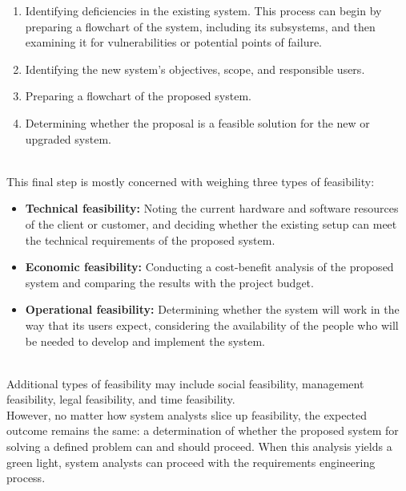 \begin{enumerate}
\item
\protect{}\label{kw8qwG1CLa-OgIdCaK4RV}
Identifying deficiencies in the existing system. This process can begin by preparing a flowchart of the system, including its subsystems, and then examining it for vulnerabilities or potential points of failure.
\item
\protect{}\label{-ak4nbWMlo0CHlHuLFpZT}
Identifying the new system's objectives, scope, and responsible users.
\item
\protect{}\label{VHtuj_CAzDUsZLxS2klvK}
Preparing a flowchart of the proposed system.
\item
\protect{}\label{w7Er1ROzxb5C5wgQUxPcC}
Determining whether the proposal is a feasible solution for the new or upgraded system.
\end{enumerate}
\\
This final step is mostly concerned with weighing three types of feasibility:

\begin{itemize}
\item
\protect{}\label{GjoApvV-ZDsQj1Kjb7LhV}
\textbf{Technical feasibility:} Noting the current hardware and software resources of the client or customer, and deciding whether the existing setup can meet the technical requirements of the proposed system.
\item
\protect{}\label{hh5gA-vYqvm9b1d7O46UT}
\textbf{Economic feasibility:} Conducting a cost-benefit analysis of the proposed system and comparing the results with the project budget.
\item
\protect{}\label{p64mncr5QGaK9mMMZuHzW}
\textbf{Operational feasibility:} Determining whether the system will work in the way that its users expect, considering the availability of the people who will be needed to develop and implement the system.
\end{itemize}
\\
Additional types of feasibility may include social feasibility, management feasibility, legal feasibility, and time feasibility.
\\
However, no matter how system analysts slice up feasibility, the expected outcome remains the same: a determination of whether the proposed system for solving a defined problem can and should proceed. When this analysis yields a green light, system analysts can proceed with the requirements engineering process.
\\
